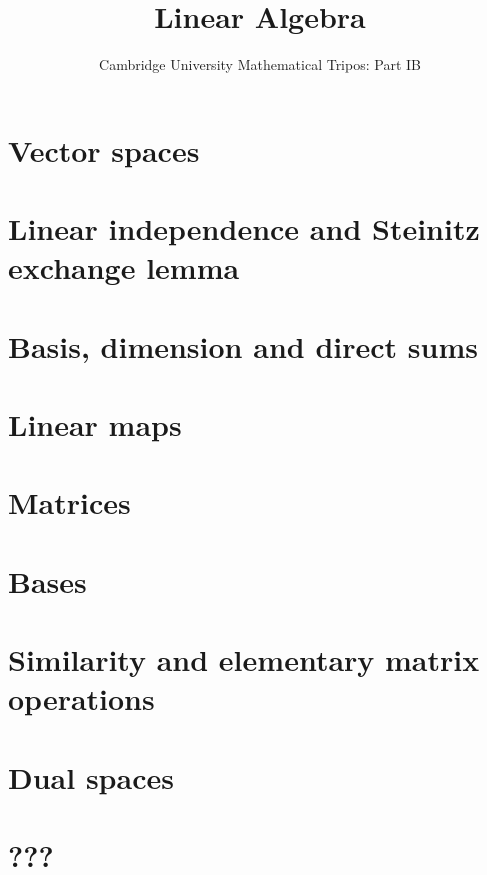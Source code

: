 \documentclass{article}
\title{Linear Algebra}
\author{Cambridge University Mathematical Tripos: Part IB}
\begin{document}
\maketitle

\tableofcontentsnewpage{}

\section{Vector spaces}

\section{Linear independence and Steinitz exchange lemma}

\section{Basis, dimension and direct sums}

\section{Linear maps}

\section{Matrices}

\section{Bases}

\section{Similarity and elementary matrix operations}

\section{Dual spaces}

\section{???}

\end{document}
